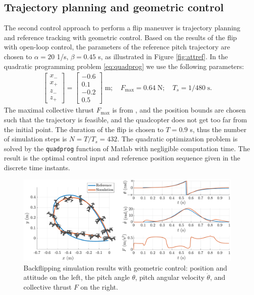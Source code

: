 
\pagebreak
\subsection{Trajectory planning and geometric control}

The second control approach to perform a flip maneuver is trajectory planning and reference tracking with geometric control. Based on the results of the flip with open-loop control, the parameters of the reference pitch trajectory are chosen to $\alpha=20$ 1/s, $\beta=0.45$ s, as illustrated in Figure \ref{fig:attref}. In the quadratic programming problem \eqref{eq:quadprog} we use the following parameters:
\begin{align*}
    \begin{bmatrix} x_- \\ x_+ \\ z_- \\ z_+ \end{bmatrix} =  \begin{bmatrix} -0.6 \\ 0.1 \\ -0.2 \\ 0.5 \end{bmatrix}\;\mathrm{m};\quad F_\mathrm{max} = 0.64\;\mathrm{N}; \quad T_s = 1/480\;\mathrm{s}.
\end{align*}
The maximal collective thrust $F_\mathrm{max}$ is from \cite{Forster}, and the position bounds are chosen such that the trajectory is feasible, and the quadcopter does not get too far from the initial point. The duration of the flip is chosen to $T=0.9$ s, thus the number of simulation steps is $N=T/T_s=432$. The quadratic optimization problem is solved by the \verb+quadprog+ function of Matlab with negligible computation time. The result is the optimal control input and reference position sequence given in the discrete time instants.


\begin{figure}
\centering
\includegraphics[width=\linewidth]{Fig/geomsimu.pdf}
\caption{Backflipping simulation results with geometric control: position and attitude on the left, the pitch angle $\theta$, pitch angular velocity $\dot{\theta}$, and collective thrust $F$ on the right.}\label{fig:geomsimu}
\end{figure}

